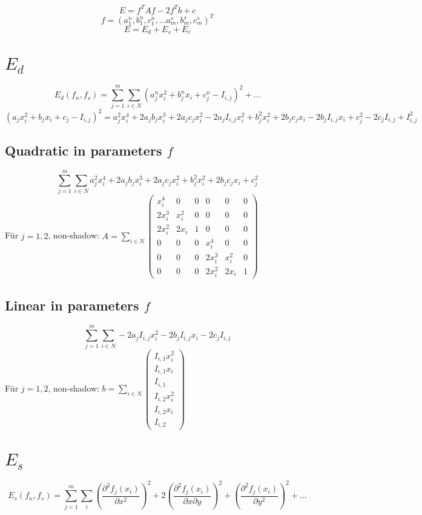 \documentclass[a4paper,10pt]{scrartcl}
\begin{document}
$$E = f^T A f - 2 f^T b + c$$
$$f = (a_1^n, b_1^n, c_1^n, \dots a_m^s, b_m^s, c_m^s)^T$$
$$E = E_d + E_s + E_c$$

\section{$E_d$}
$$E_d (f_n, f_s) = \sum_{j=1}^{m} \sum_{i \in N} (a_j^n x_i^2 + b_j^n x_i + c_j^n - I_{i,j})^2 + \dots$$
$$(a_j x_i^2+b_j x_i+c_j-I_{i,j})^2 = a_j^2 x_i^4+2 a_j b_j x_i^3+2 a_j c_j x_i^2-2 a_j I_{i,j} x_i^2+b_j^2 x_i^2+2 b_j c_j x_i-2 b_j I_{i,j} x_i+c_j^2-2 c_j I_{i,j}+I_{i,j}^2$$
\subsection{Quadratic in parameters $f$}
$$ \sum_{j=1}^{m} \sum_{i \in N} a_j^2 x_i^4+2 a_j b_j x_i^3+2 a_j c_j x_i^2+b_j^2 x_i^2+2 b_j c_j x_i+c_j^2$$
Für $j=1,2$, non-shadow:
$A = \sum_{i \in N}
\begin{pmatrix}
x_i^4 & 0 & 0 & 0 & 0 & 0 \\
2 x_i^3 & x_i^2 & 0 & 0 & 0 & 0 \\
2 x_i^2 & 2 x_i & 1 & 0 & 0 & 0 \\
0 & 0 & 0 & x_i^4 & 0 & 0 \\
0 & 0 & 0 & 2 x_i^3 & x_i^2 & 0 \\
0 & 0 & 0 & 2 x_i^2 & 2 x_i & 1
\end{pmatrix}
$
\subsection{Linear in parameters $f$}
$$\sum_{j=1}^{m} \sum_{i \in N} -2 a_j I_{i,j} x_i^2-2 b_j I_{i,j} x_i-2 c_j I_{i,j}$$
Für $j=1,2$, non-shadow:
$b = \sum_{i \in N} 
\begin{pmatrix} 
I_{i,1} x_i^2 \\
I_{i,1} x_i\\
I_{i,1} \\
I_{i,2} x_i^2 \\
I_{i,2} x_i\\
I_{i,2}
\end{pmatrix}
$

\section{$E_s$}
$$E_s(f_n, f_s) = \sum_{j=1}^m \sum_{i} (\frac{\partial^2 f_j(x_i)}{\partial x^2})^2 + 2 (\frac{\partial^2 f_j(x_i)}{\partial x \partial y})^2 + (\frac{\partial^2 f_j(x_i)}{\partial y^2})^2 + ...$$
\end{document}
